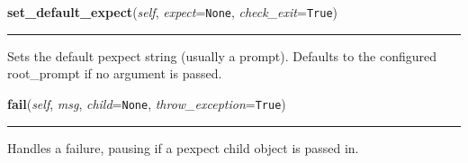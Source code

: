     \label{shutit_global:ShutIt:set_default_expect}

    \vspace{0.5ex}

\hspace{.8\funcindent}\begin{boxedminipage}{\funcwidth}

    \raggedright \textbf{set\_default\_expect}(\textit{self}, \textit{expect}={\tt None}, \textit{check\_exit}={\tt True})

    \vspace{-1.5ex}

    \rule{\textwidth}{0.5\fboxrule}
\setlength{\parskip}{2ex}
    Sets the default pexpect string (usually a prompt). Defaults to the 
    configured root\_prompt if no argument is passed.

\setlength{\parskip}{1ex}
    \end{boxedminipage}

    \label{shutit_global:ShutIt:fail}

    \vspace{0.5ex}

\hspace{.8\funcindent}\begin{boxedminipage}{\funcwidth}

    \raggedright \textbf{fail}(\textit{self}, \textit{msg}, \textit{child}={\tt None}, \textit{throw\_exception}={\tt True})

    \vspace{-1.5ex}

    \rule{\textwidth}{0.5\fboxrule}
\setlength{\parskip}{2ex}
    Handles a failure, pausing if a pexpect child object is passed in.

\setlength{\parskip}{1ex}
    \end{boxedminipage}

    \label{shutit_global:ShutIt:log}

    \vspace{0.5ex}

